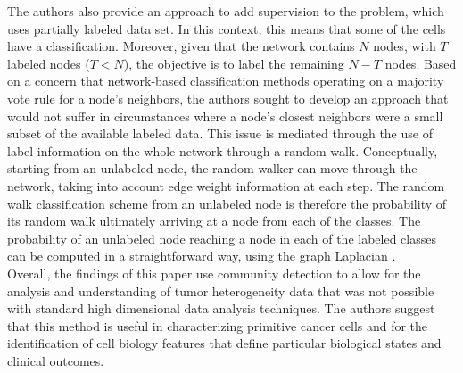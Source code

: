 The authors also provide an approach to add supervision to the problem, which uses partially labeled data set. In this context, this means that some of the cells have a classification. Moreover, given that the network contains $N$ nodes, with $T$ labeled nodes ($T<N$), the objective is to label the remaining $N-T$ nodes. Based on a concern that network-based classification methods operating on a majority vote rule for a node's neighbors, the authors sought to develop an approach that would not suffer in circumstances where a node's closest neighbors were a small subset of the available labeled data. This issue is mediated through the use of label information on the whole network through a random walk. Conceptually, starting from an unlabeled node, the random walker can move through the network, taking into account edge weight information at each step. The random walk classification scheme from an unlabeled node is therefore the probability of its random walk ultimately arriving at a node from each of the classes.  The probability of an unlabeled node reaching a node in each of the labeled classes can be computed in a straightforward way, using the graph Laplacian \cite{RWR}. \\
\indent Overall, the findings of this paper use community detection to allow for the analysis and understanding of tumor heterogeneity data that was not possible with standard high dimensional data analysis techniques.  The authors suggest that this method is useful in characterizing primitive cancer cells and for the identification of cell biology features that define particular biological states and clinical outcomes. 

